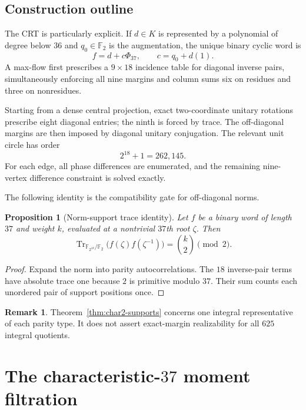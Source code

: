 \documentclass[11pt]{article}
\newtheorem{proposition}[theorem]{Proposition}
\theoremstyle{definition}
\newtheorem{remark}[theorem]{Remark}
\newcommand{\F}{\mathbb{F}}
\newcommand{\Tr}{\operatorname{Tr}}
\begin{document}
\subsection{Construction outline}

The CRT is particularly explicit.  If \(d\in K\) is represented by a
polynomial of degree below \(36\) and \(q_0\in\F_2\) is the augmentation,
the unique binary cyclic word is
\[
 f=d+c\Phi_{37},\qquad c=q_0+d(1).
\tag{6.3}\label{eq:char2-crt}
\]
A max-flow first prescribes a \(9\times18\) incidence table for diagonal
inverse pairs, simultaneously enforcing all nine margins and column sums
six on residues and three on nonresidues.

Starting from a dense central projection, exact two-coordinate unitary
rotations prescribe eight diagonal entries; the ninth is forced by trace.
The off-diagonal margins are then imposed by diagonal unitary conjugation.
The relevant unit circle has order
\[
2^{18}+1=262{,}145.
\]
For each edge, all phase differences are enumerated, and the remaining
nine-vertex difference constraint is solved exactly.

The following identity is the compatibility gate for off-diagonal norms.

\begin{proposition}[Norm-support trace identity]
\label{prop:norm-support}
Let \(f\) be a binary word of length \(37\) and weight \(k\), evaluated at
a nontrivial \(37\)th root \(\zeta\).  Then
\[
\Tr_{\F_{2^{18}}/\F_2}
\bigl(f(\zeta)f(\zeta^{-1})\bigr)
=\binom{k}{2}\pmod2.
\tag{6.4}\label{eq:norm-support}
\]
\end{proposition}

\begin{proof}
Expand the norm into parity autocorrelations.  The \(18\) inverse-pair
terms have absolute trace one because \(2\) is primitive modulo \(37\).
Their sum counts each unordered pair of support positions once.
\end{proof}

\begin{remark}
Theorem~\ref{thm:char2-supports} concerns one integral representative of
each parity type.  It does not assert exact-margin realizability for all
\(625\) integral quotients.
\end{remark}

\section{The characteristic-\texorpdfstring{\(37\)}{37} moment filtration}
\label{sec:char37}
\end{document}

